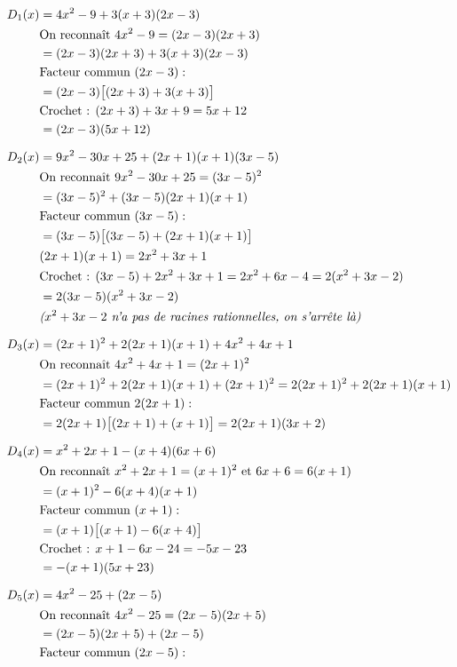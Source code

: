 \documentclass[11pt]{article}
\begin{document}
	\[
	\begin{aligned}
		D_1(x) &= 4x^2-9+3(x+3)(2x-3)\\
		&\text{On reconnaît } 4x^2-9=(2x-3)(2x+3)\\
		&= (2x-3)(2x+3)+3(x+3)(2x-3)\\
		&\text{Facteur commun } (2x-3) :\\
		&= (2x-3)\big[(2x+3)+3(x+3)\big]\\
		&\text{Crochet : } (2x+3)+3x+9 = 5x+12\\
		&= (2x-3)(5x+12)\\[6pt]
		D_2(x) &= 9x^2-30x+25+(2x+1)(x+1)(3x-5)\\
		&\text{On reconnaît } 9x^2-30x+25=(3x-5)^2\\
		&= (3x-5)^2+(3x-5)(2x+1)(x+1)\\
		&\text{Facteur commun } (3x-5) :\\
		&= (3x-5)\big[(3x-5)+(2x+1)(x+1)\big]\\
		&(2x+1)(x+1) = 2x^2+3x+1\\
		&\text{Crochet : } (3x-5)+2x^2+3x+1 = 2x^2+6x-4 = 2(x^2+3x-2)\\
		&= 2(3x-5)(x^2+3x-2)\\
		&\text{\emph{($x^2+3x-2$ n'a pas de racines rationnelles, on s'arrête là)}}\\[6pt]
		D_3(x) &= (2x+1)^2+2(2x+1)(x+1)+4x^2+4x+1\\
		&\text{On reconnaît } 4x^2+4x+1 = (2x+1)^2\\
		&= (2x+1)^2+2(2x+1)(x+1)+(2x+1)^2 = 2(2x+1)^2+2(2x+1)(x+1)\\
		&\text{Facteur commun } 2(2x+1) :\\
		&= 2(2x+1)\big[(2x+1)+(x+1)\big] = 2(2x+1)(3x+2)\\[6pt]
		D_4(x) &= x^2+2x+1-(x+4)(6x+6)\\
		&\text{On reconnaît } x^2+2x+1=(x+1)^2 \text{ et } 6x+6=6(x+1)\\
		&= (x+1)^2-6(x+4)(x+1)\\
		&\text{Facteur commun } (x+1) :\\
		&= (x+1)\big[(x+1)-6(x+4)\big]\\
		&\text{Crochet : } x+1-6x-24 = -5x-23\\
		&= -(x+1)(5x+23)\\[6pt]
		D_5(x) &= 4x^2-25+(2x-5)\\
		&\text{On reconnaît } 4x^2-25=(2x-5)(2x+5)\\
		&= (2x-5)(2x+5)+(2x-5)\\
		&\text{Facteur commun } (2x-5) :\\

\end{aligned}\]
\end{document}
